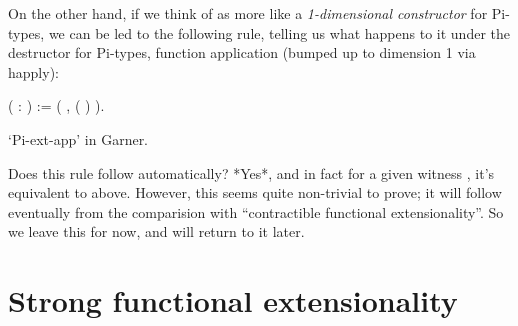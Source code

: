 \documentclass[12pt]{report}
\begin{document}
On the other hand, if we think of  as more like a \textit{1-dimensional constructor} for Pi-types,  we can be led to the following rule, telling us what happens to it under the destructor for Pi-types, function application (bumped up to dimension 1 via happly): \begin{coqdoccode}
\coqdocemptyline
\coqdocnoindent
{}  ( : )\coqdoceol
\coqdocindent{1.00em}
:= (\coqdockw{\ensuremath{\forall}}      ,\coqdoceol
\coqdocindent{3.00em}
 (     )    ).\coqdoceol
\end{coqdoccode}
‘Pi-ext-app’ in Garner. \begin{coqdoccode}
\coqdocemptyline
\end{coqdoccode}
Does this rule follow automatically?  *Yes*, and in fact for a given witness , it’s equivalent to  above.  However, this seems quite non-trivial to prove; it will follow eventually from the comparision with “contractible functional extensionality”.  So we leave this for now, and will return to it later. \begin{coqdoccode}
\coqdocemptyline
\end{coqdoccode}
\section{Strong functional extensionality}
\end{document}
